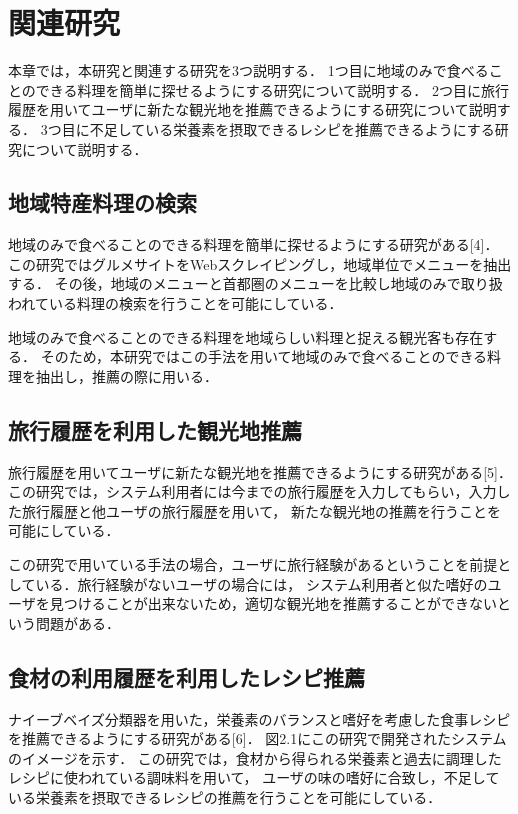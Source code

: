 \documentclass{funthesis}
\begin{document}

\chapter{関連研究}
本章では，本研究と関連する研究を3つ説明する．
1つ目に地域のみで食べることのできる料理を簡単に探せるようにする研究について説明する．
2つ目に旅行履歴を用いてユーザに新たな観光地を推薦できるようにする研究について説明する．
3つ目に不足している栄養素を摂取できるレシピを推薦できるようにする研究について説明する．

\section{地域特産料理の検索}
地域のみで食べることのできる料理を簡単に探せるようにする研究がある[4]．
この研究ではグルメサイトをWebスクレイピングし，地域単位でメニューを抽出する．
その後，地域のメニューと首都圏のメニューを比較し地域のみで取り扱われている料理の検索を行うことを可能にしている．

地域のみで食べることのできる料理を地域らしい料理と捉える観光客も存在する．
そのため，本研究ではこの手法を用いて地域のみで食べることのできる料理を抽出し，推薦の際に用いる．

\section{旅行履歴を利用した観光地推薦}
旅行履歴を用いてユーザに新たな観光地を推薦できるようにする研究がある[5]．
この研究では，システム利用者には今までの旅行履歴を入力してもらい，入力した旅行履歴と他ユーザの旅行履歴を用いて，
新たな観光地の推薦を行うことを可能にしている．

この研究で用いている手法の場合，ユーザに旅行経験があるということを前提としている．旅行経験がないユーザの場合には，
システム利用者と似た嗜好のユーザを見つけることが出来ないため，適切な観光地を推薦することができないという問題がある．

\section{食材の利用履歴を利用したレシピ推薦}
ナイーブベイズ分類器を用いた，栄養素のバランスと嗜好を考慮した食事レシピを推薦できるようにする研究がある[6]．
図2.1にこの研究で開発されたシステムのイメージを示す．
この研究では，食材から得られる栄養素と過去に調理したレシピに使われている調味料を用いて，
ユーザの味の嗜好に合致し，不足している栄養素を摂取できるレシピの推薦を行うことを可能にしている．
\end{document}
